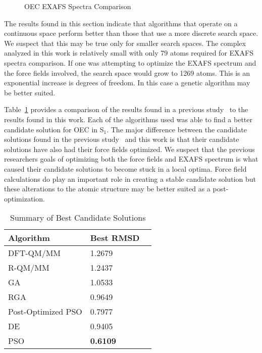 \begin{figure*}
	\centering
	\caption{OEC EXAFS Spectra Comparison}
	\label{fig:pso-best}
\end{figure*}

The results found in this section indicate that algorithms that operate on a continuous space perform better than those that use a more discrete search space. We suspect that this may be true only for smaller search spaces. The complex analyzed in this work is relatively small with only 79 atoms required for EXAFS spectra comparison. If one was attempting to optimize the EXAFS spectrum and the force fields involved, the search space would grow to 1269 atoms. This is an exponential increase is degrees of freedom. In this case a genetic algorithm may be better suited.

Table~\ref{fig:summary-rmsd} provides a comparison of the results found in a previous study~\cite{luber2011s1} to the results found in this work. Each of the algorithms used was able to find a better candidate solution for OEC in S$_{1}$. The major difference between the candidate solutions found in the previous study~\cite{luber2011s1} and this work is that their candidate solutions have also had their force fields optimized. We suspect that the previous researchers goals of optimizing both the force fields and EXAFS spectrum is what caused their candidate solutions to become stuck in a local optima. Force field calculations do play an important role in creating a stable candidate solution but these alterations to the atomic structure may be better suited as a post-optimization.

\begin{table}
	\centering
	\begin{tabular}{ | l | l | l | }
		\hline
		Algorithm & Best RMSD \\ \hline
		DFT-QM/MM~\cite{luber2011s1} & 1.2679 \\ \hline
		R-QM/MM~\cite{luber2011s1} & 1.2437 \\ \hline
		GA & 1.0533 \\ \hline
		RGA & 0.9649 \\ \hline
		Post-Optimized PSO & 0.7977 \\ \hline
		DE & 0.9405 \\ \hline
		PSO & \textbf{0.6109} \\ \hline
	\end{tabular}
	\caption{Summary of Best Candidate Solutions}
	\label{fig:summary-rmsd}
\end{table}